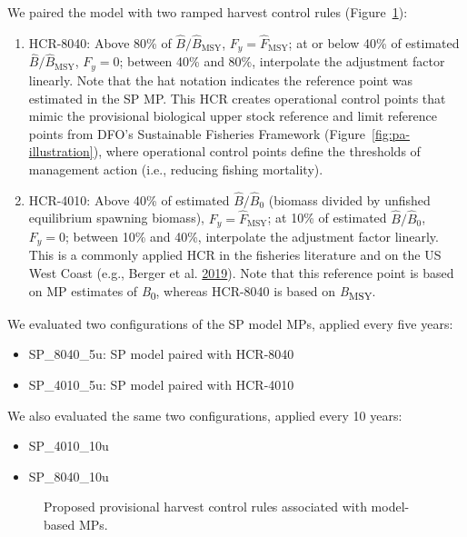 \documentclass[11pt]{book}
\begin{document}
We paired the model with two ramped harvest control rules (Figure~\ref{fig:mp-hcrs}):
\begin{enumerate}
\def\labelenumi{\arabic{enumi}.}
\item
  HCR-8040: Above 80\% of \(\hat{B}/\hat{B}_\textrm{MSY}\), \(F_y = \hat{F}_\textrm{MSY}\); at or below 40\% of estimated \(\hat{B}/\hat{B}_\textrm{MSY}\), \(F_y = 0\); between 40\% and 80\%, interpolate the adjustment factor linearly. Note that the hat notation indicates the reference point was estimated in the SP MP. This HCR creates operational control points that mimic the provisional biological upper stock reference and limit reference points from DFO's Sustainable Fisheries Framework (Figure~\ref{fig:pa-illustration}), where operational control points define the thresholds of management action (i.e., reducing fishing mortality).
\item
  HCR-4010: Above 40\% of estimated \(\hat{B}/\hat{B}_0\) (biomass divided by unfished equilibrium spawning biomass), \(F_y = \hat{F}_\textrm{MSY}\); at 10\% of estimated \(\hat{B}/\hat{B}_0\), \(F_y = 0\); between 10\% and 40\%, interpolate the adjustment factor linearly. This is a commonly applied HCR in the fisheries literature and on the US West Coast (e.g., Berger et al. \protect\hyperlink{ref-berger_2019}{2019}). Note that this reference point is based on MP estimates of \emph{B}\textsubscript{0}, whereas HCR-8040 is based on \emph{B}\textsubscript{MSY}.
\end{enumerate}
We evaluated two configurations of the SP model MPs, applied every five years:
\begin{itemize}
\item
  SP\_8040\_5u: SP model paired with HCR-8040
\item
  SP\_4010\_5u: SP model paired with HCR-4010
\end{itemize}
We also evaluated the same two configurations, applied every 10 years:
\begin{itemize}
\item
  SP\_4010\_10u
\item
  SP\_8040\_10u
\end{itemize}
\begin{figure}[htb]

{\centering {} 

}

\caption{Proposed provisional harvest control rules associated with model-based MPs.}\label{fig:mp-hcrs}
\end{figure}
\end{document}
